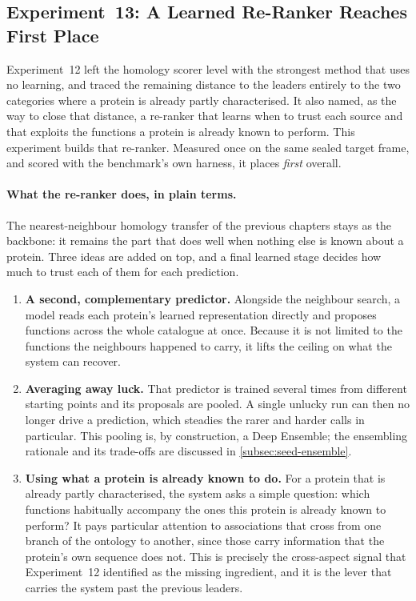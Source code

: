 \subsection{Experiment~13: A Learned Re-Ranker Reaches First Place}
\label{subsec:exp13-lafa-number-one}

Experiment~12 left the homology scorer level with the strongest method that uses
no learning, and traced the remaining distance to the leaders entirely to the two
categories where a protein is already partly characterised. It also named, as the
way to close that distance, a re-ranker that learns when to trust each source and
that exploits the functions a protein is already known to perform. This experiment
builds that re-ranker. Measured once on the same sealed target frame, and scored
with the benchmark's own harness, it places \emph{first} overall.

\paragraph{What the re-ranker does, in plain terms.}
The nearest-neighbour homology transfer of the previous chapters stays as the
backbone: it remains the part that does well when nothing else is known about a
protein. Three ideas are added on top, and a final learned stage decides how much
to trust each of them for each prediction.

\begin{enumerate}
  \item \textbf{A second, complementary predictor.} Alongside the neighbour
    search, a model reads each protein's learned representation directly and
    proposes functions across the whole catalogue at once. Because it is not
    limited to the functions the neighbours happened to carry, it lifts the
    ceiling on what the system can recover.
  \item \textbf{Averaging away luck.} That predictor is trained several times from
    different starting points and its proposals are pooled. A single unlucky run
    can then no longer drive a prediction, which steadies the rarer and harder
    calls in particular. This pooling is, by construction, a Deep Ensemble; the
    ensembling rationale and its trade-offs are discussed in
    \cref{subsec:seed-ensemble}.
  \item \textbf{Using what a protein is already known to do.} For a protein that
    is already partly characterised, the system asks a simple question: which
    functions habitually accompany the ones this protein is already known to
    perform? It pays particular attention to associations that cross from one
    branch of the ontology to another, since those carry information that the
    protein's own sequence does not. This is precisely the cross-aspect signal
    that Experiment~12 identified as the missing ingredient, and it is the lever
    that carries the system past the previous leaders.
\end{enumerate}

